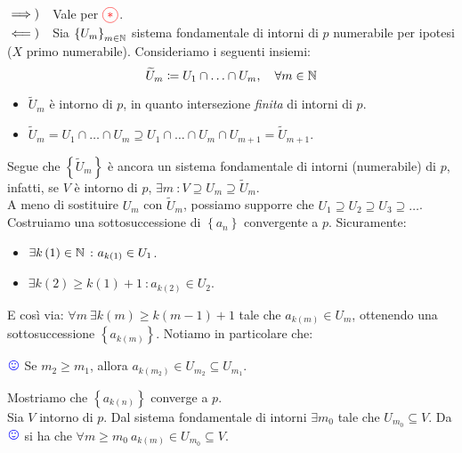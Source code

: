 \begin{demonstration}~{}\\
	$\implies)\quad$Vale per $\textcolor{red}{\circled{\ast}}$.\\
	$\impliedby)\quad$Sia $\left\{U_m\right\}_{m\in\mathbb{N}}$ sistema fondamentale di intorni di $p$ numerabile per ipotesi ($X$ primo numerabile). Consideriamo i seguenti insiemi:
	\begin{equation*}
	\widetilde{U}_m\coloneqq U_1\cap\ldots \cap U_m,\quad \forall m\in \mathbb{N}
	\end{equation*}
\begin{itemize}
	\item $\widetilde{U}_m$ è intorno di $p$, in quanto intersezione \textit{finita} di intorni di $p$.
	\item $\widetilde{U}_m=U_1\cap\ldots\cap U_m\supseteq U_1\cap\ldots\cap U_m\cap U_{m+1}=\widetilde{U}_{m+1}$.
\end{itemize}
Segue che $\left\{\widetilde{U}_m\right\}$ è ancora un sistema fondamentale di intorni (numerabile) di $p$, infatti, se $V$ è intorno di $p$, $\exists m\ \colon V\supseteq U_m\supseteq \widetilde{U}_m$.\\
A meno di sostituire $U_m$ con $\widetilde{U}_m$, possiamo supporre che $U_1\supseteq U_2\supseteq U_3\supseteq \ldots$.\\
Costruiamo una sottosuccessione di $\left\{a_n\right\}$ convergente a $p$. Sicuramente:
\begin{itemize}
	\item $\exists k\left(1\right)\in \mathbb{N}\ \colon a_{k\left(1\right)}\in U_1$.
	\item $\exists k\left(2\right)\geq k\left(1\right)+1\ \colon a_{k\left(2\right)}\in U_2$.
\end{itemize}
E così via: $\forall m\ \exists k\left(m\right)\geq k\left(m-1\right)+1$ tale che $a_{k\left(m\right)}\in U_m$, ottenendo una sottosuccessione $\left\{a_{k\left(m\right)}\right\}$. Notiamo in particolare che:
\begin{center}
\label{notasorridente} $\textcolor{blue}{{\large \smiley{}}}$ Se $m_2\geq m_1$, allora $a_{k\left(m_2\right)}\in U_{m_2}\subseteq U_{m_1}$.
\end{center}
Mostriamo che $\left\{a_{k\left(n\right)}\right\}$ converge a $p$.\\
Sia $V$ intorno di $p$. Dal sistema fondamentale di intorni $\exists m_0$ tale che $U_{m_0}\subseteq V$. Da $\textcolor{blue}{{\large \smiley{}}}$ si ha che $\forall m\geq m_0\ a_{k\left(m\right)}\in U_{m_0}\subseteq V$.
\end{demonstration}
